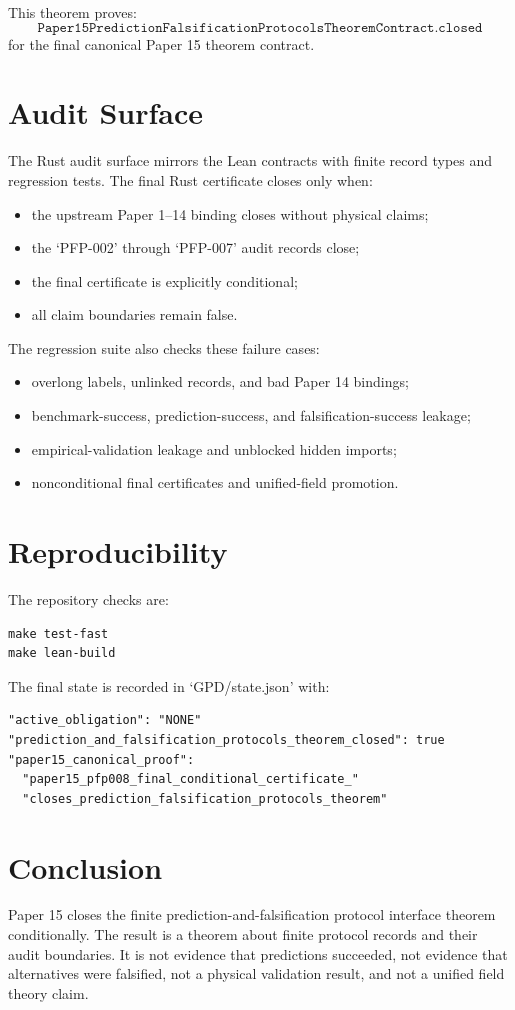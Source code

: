 \documentclass{article}
\begin{document}
This theorem proves:
\[
\texttt{Paper15PredictionFalsificationProtocolsTheoremContract.closed}
\]
for the final canonical Paper 15 theorem contract.

\section{Audit Surface}

The Rust audit surface mirrors the Lean contracts with finite record types and
regression tests. The final Rust certificate closes only when:

\begin{itemize}[leftmargin=*]
\item the upstream Paper 1--14 binding closes without physical claims;
\item the `PFP-002' through `PFP-007' audit records close;
\item the final certificate is explicitly conditional;
\item all claim boundaries remain false.
\end{itemize}

The regression suite also checks these failure cases:

\begin{itemize}[leftmargin=*]
\item overlong labels, unlinked records, and bad Paper 14 bindings;
\item benchmark-success, prediction-success, and falsification-success
  leakage;
\item empirical-validation leakage and unblocked hidden imports;
\item nonconditional final certificates and unified-field promotion.
\end{itemize}

\section{Reproducibility}

The repository checks are:

\begin{verbatim}
make test-fast
make lean-build
\end{verbatim}

The final state is recorded in `GPD/state.json' with:

\begin{verbatim}
"active_obligation": "NONE"
"prediction_and_falsification_protocols_theorem_closed": true
"paper15_canonical_proof":
  "paper15_pfp008_final_conditional_certificate_"
  "closes_prediction_falsification_protocols_theorem"
\end{verbatim}

\section{Conclusion}

Paper 15 closes the finite prediction-and-falsification protocol interface
theorem conditionally. The result is a theorem about finite protocol records
and their audit boundaries. It is not evidence that predictions succeeded, not
evidence that alternatives were falsified, not a physical validation result,
and not a unified field theory claim.
\end{document}
